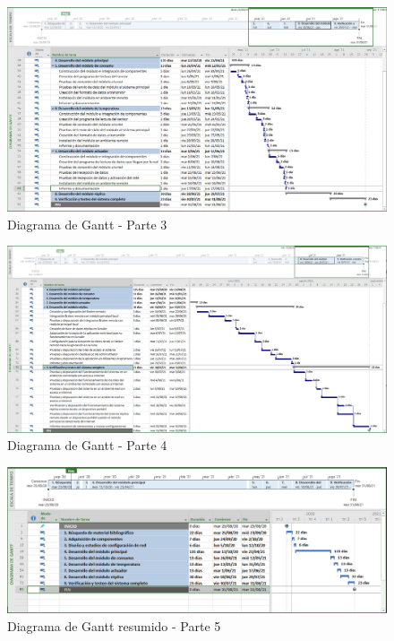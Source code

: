 \documentclass[11pt]{charter}
\begin{document}
\begin{landscape} %
\begin{figure}[htpb]
\centering 
\includegraphics[width=1.5\textwidth]{./Figuras/gantt03.png}
\caption{Diagrama de Gantt - Parte 3}
\label{fig:gantt3}
\end{figure}
\end{landscape} %
\begin{landscape} %
\begin{figure}[htpb]
\centering 
\includegraphics[width=1.5\textwidth]{./Figuras/gantt04.png}
\caption{Diagrama de Gantt - Parte 4}
\label{fig:gantt4}
\end{figure}
\end{landscape} %

\begin{landscape} %

\begin{figure}[htpb]
\centering 
\includegraphics[width=1.5\textwidth]{./Figuras/gantt05.png}
\caption{Diagrama de Gantt resumido - Parte 5}
\label{fig:gantt5}
\end{figure}

\end{landscape} %
\end{document}

